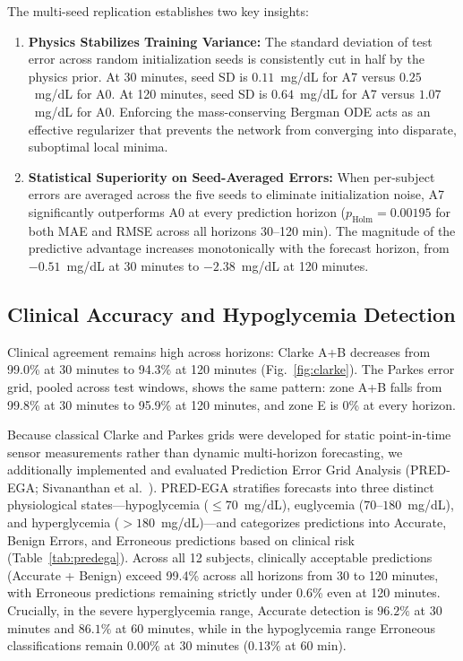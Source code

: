 \documentclass[journal]{IEEEtran}
\begin{document}
The multi-seed replication establishes two key insights:
\begin{enumerate}
    \item \textbf{Physics Stabilizes Training Variance:} The standard deviation of test error across random initialization seeds is consistently cut in half by the physics prior. At 30 minutes, seed SD is $0.11$~mg/dL for A7 versus $0.25$~mg/dL for A0. At 120 minutes, seed SD is $0.64$~mg/dL for A7 versus $1.07$~mg/dL for A0. Enforcing the mass-conserving Bergman ODE acts as an effective regularizer that prevents the network from converging into disparate, suboptimal local minima.
    \item \textbf{Statistical Superiority on Seed-Averaged Errors:} When per-subject errors are averaged across the five seeds to eliminate initialization noise, A7 significantly outperforms A0 at every prediction horizon ($p_{\text{Holm}} = 0.00195$ for both MAE and RMSE across all horizons 30--120 min). The magnitude of the predictive advantage increases monotonically with the forecast horizon, from $-0.51$~mg/dL at 30 minutes to $-2.38$~mg/dL at 120 minutes.
\end{enumerate}

\subsection{Clinical Accuracy and Hypoglycemia Detection}

Clinical agreement remains high across horizons: Clarke A+B decreases from 99.0\% at 30 minutes to 94.3\% at 120 minutes (Fig.~\ref{fig:clarke}). The Parkes error grid, pooled across test windows, shows the same pattern: zone A+B falls from 99.8\% at 30 minutes to 95.9\% at 120 minutes, and zone E is 0\% at every horizon.

Because classical Clarke and Parkes grids were developed for static point-in-time sensor measurements rather than dynamic multi-horizon forecasting, we additionally implemented and evaluated Prediction Error Grid Analysis (PRED-EGA; Sivananthan et al.~\cite{ref53}). PRED-EGA stratifies forecasts into three distinct physiological states—hypoglycemia ($\le 70$~mg/dL), euglycemia ($70$--$180$~mg/dL), and hyperglycemia ($> 180$~mg/dL)—and categorizes predictions into Accurate, Benign Errors, and Erroneous predictions based on clinical risk (Table~\ref{tab:predega}). Across all 12 subjects, clinically acceptable predictions (Accurate + Benign) exceed 99.4\% across all horizons from 30 to 120 minutes, with Erroneous predictions remaining strictly under 0.6\% even at 120 minutes. Crucially, in the severe hyperglycemia range, Accurate detection is $96.2\%$ at 30 minutes and $86.1\%$ at 60 minutes, while in the hypoglycemia range Erroneous classifications remain $0.00\%$ at 30 minutes ($0.13\%$ at 60 min).
\end{document}

